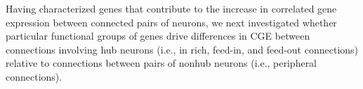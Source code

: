 \documentclass[10pt,letterpaper]{article}
\begin{document}
{%
Having characterized genes that contribute to the increase in correlated gene expression between connected pairs of neurons, we next investigated whether particular functional groups of genes drive differences in CGE between connections involving hub neurons (i.e., in rich, feed-in, and feed-out connections) relative to connections between pairs of nonhub neurons (i.e., peripheral connections).
}
\end{document}
